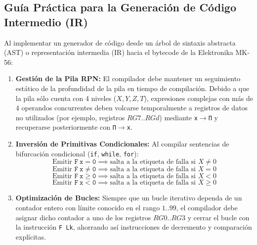 \documentclass[11pt,a4paper]{article}
\begin{document}
\subsection{Guía Práctica para la Generación de Código Intermedio (IR)}
Al implementar un generador de código desde un árbol de sintaxis abstracta (AST) o representación intermedia (IR) hacia el bytecode de la Elektronika MK-56:
\begin{enumerate}
    \item \textbf{Gestión de la Pila RPN:} El compilador debe mantener un seguimiento estático de la profundidad de la pila en tiempo de compilación. Debido a que la pila sólo cuenta con 4 niveles ($X, Y, Z, T$), expresiones complejas con más de 4 operandos concurrentes deben volcarse temporalmente a registros de datos no utilizados (por ejemplo, registros $RG7..RGd$) mediante \texttt{x$\to$П} y recuperarse posteriormente con \texttt{П$\to$x}.
    \item \textbf{Inversión de Primitivas Condicionales:} Al compilar sentencias de bifurcación condicional (\texttt{if}, \texttt{while}, \texttt{for}):
    \[
    \text{Emitir } \mathtt{F\ x=0} \implies \text{salta a la etiqueta de falla si } X \ne 0
    \]
    \[
    \text{Emitir } \mathtt{F\ x\neq0} \implies \text{salta a la etiqueta de falla si } X = 0
    \]
    \[
    \text{Emitir } \mathtt{F\ x\ge0} \implies \text{salta a la etiqueta de falla si } X < 0
    \]
    \[
    \text{Emitir } \mathtt{F\ x<0} \implies \text{salta a la etiqueta de falla si } X \ge 0
    \]
    \item \textbf{Optimización de Bucles:} Siempre que un bucle iterativo dependa de un contador entero con límite conocido en el rango $1..99$, el compilador debe asignar dicho contador a uno de los registros $RG0..RG3$ y cerrar el bucle con la instrucción \texttt{F Lk}, ahorrando así instrucciones de decremento y comparación explícitas.
\end{enumerate}
\end{document}
